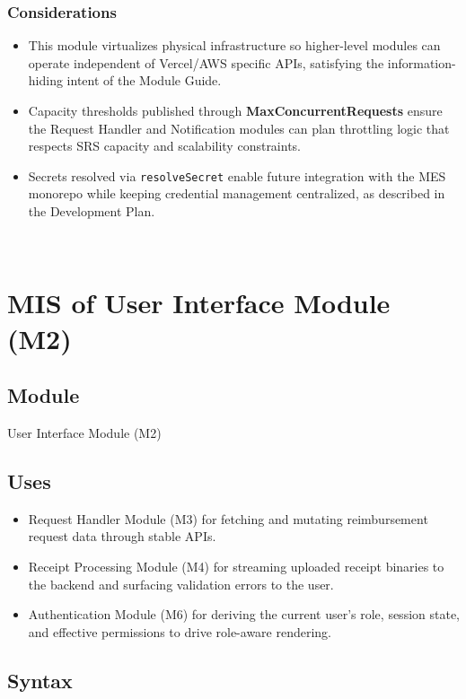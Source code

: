 \documentclass[12pt, titlepage]{article}
\begin{document}
\subsubsection{Considerations}
\begin{itemize}
  \item This module virtualizes physical infrastructure so higher-level modules can operate independent of Vercel/AWS specific APIs, satisfying the information-hiding intent of the Module Guide.
  \item Capacity thresholds published through \textbf{MaxConcurrentRequests} ensure the Request Handler and Notification modules can plan throttling logic that respects SRS capacity and scalability constraints.
  \item Secrets resolved via \texttt{resolveSecret} enable future integration with the MES monorepo while keeping credential management centralized, as described in the Development Plan.
\end{itemize}

~\newpage

\section{MIS of User Interface Module (M2)} \label{ModuleUserInterface}

\subsection{Module}

User Interface Module (M2)

\subsection{Uses}

\begin{itemize}
  \item Request Handler Module (M3) for fetching and mutating reimbursement request data through stable APIs.
  \item Receipt Processing Module (M4) for streaming uploaded receipt binaries to the backend and surfacing validation errors to the user.
  \item Authentication Module (M6) for deriving the current user’s role, session state, and effective permissions to drive role-aware rendering.
\end{itemize}

\subsection{Syntax}
\end{document}
